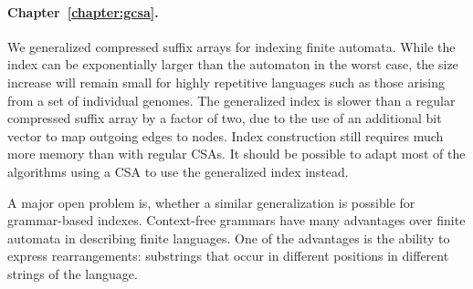 \paragraph{Chapter~\ref{chapter:gcsa}.}

We generalized compressed suffix arrays for indexing finite automata. While the index can be exponentially larger than the automaton in the worst case, the size increase will remain small for highly repetitive languages such as those arising from a set of individual genomes. The generalized index is slower than a regular compressed suffix array by a factor of two, due to the use of an additional bit vector to map outgoing edges to nodes. Index construction still requires much more memory than with regular CSAs. It should be possible to adapt most of the algorithms using a CSA to use the generalized index instead.

A major open problem is, whether a similar generalization is possible for grammar-based indexes. Context-free grammars have many advantages over finite automata in describing finite languages. One of the advantages is the ability to express rearrangements: substrings that occur in different positions in different strings of the language.
